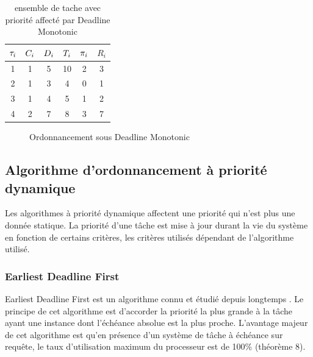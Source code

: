 \begin{table}[h]
\begin{center}
\begin{tabular}{|c|c|c|c|c|c|}
 \hline$\tau_{i}$ & $C_{i}$ & $D_{i}$ & $T_{i}$ & $\pi_{i}$ & $R_i$\\ 
 \hline1 & 1 & 5 & 10 & 2 & 3\\ 
 \hline2 & 1 & 3 & 4 & 0 & 1\\ 
 \hline3 & 1 & 4 & 5 & 1 & 2\\ 
 \hline4 & 2 & 7 & 8 & 3 & 7\\ 
 \hline
 \end{tabular}
\end{center}
\caption{ensemble de tache avec priorité affecté par Deadline Monotonic} \label{tab:exempleDM}
\end{table}
\vspace{1cm}

\begin{figure}[h]
\begin{center}
\begin{RTGrid}[height=4cm,width=12cm,labelsize=8pt,numbersize=6]{4}{10}



\end{RTGrid}
\caption{Ordonnancement sous Deadline Monotonic} \label{fig:exempleDM}
\end{center}
\end{figure}
\vspace{1cm}

\subsection{Algorithme d’ordonnancement à priorité dynamique}
\vspace{-1cm}
Les algorithmes à priorité dynamique affectent une priorité qui n'est plus une donnée statique.
La priorité d'une tâche est mise à jour durant la vie du système en fonction de certains critères, les critères utilisés dépendant de l'algorithme utilisé.

\subsubsection{Earliest Deadline First\cite{LL73}}
\vspace{-1cm}
Earliest Deadline First est un algorithme connu et étudié depuis longtemps \cite{LL73, Der74, Hor74}. Le principe de cet algorithme est d'accorder la priorité la plus grande à la tâche ayant une instance dont l'échéance absolue est la plus proche.
L'avantage majeur de cet algorithme est qu'en présence d'un système de tâche à échéance sur requête, le taux d'utilisation maximum du processeur est de 100\% (théorème 8).

